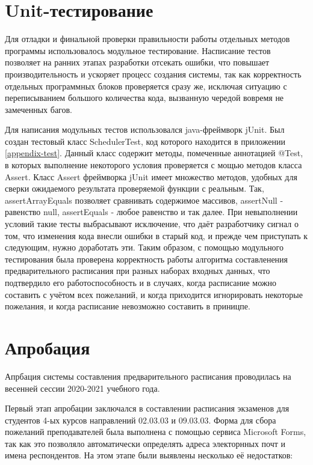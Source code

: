 \section{Unit-тестирование} \label{ch4:sec2}

 Для отладки и финальной проверки правильности работы отдельных методов программы использовалось модульное тестирование. Насписание тестов позволяет на ранних этапах разработки отсекать ошибки, что повышает производительность и ускоряет процесс создания системы, так как корректность отдельных программных блоков проверяется сразу же, исключая ситуацию с переписыванием большого количества кода, вызванную чередой вовремя не замеченных багов.
 
 Для написания модульных тестов использовался java-фреймворк jUnit. Был создан тестовый класс SchedulerTest, код которого находится в приложении \ref{appendix-test}. Данный класс содержит методы, помеченные аннотацией @Test, в которых выполнение некоторого условия проверяется с мощью методов класса Assert. Класс Assert фреймворка jUnit имеет множество методов, удобных для сверки ожидаемого результата проверяемой функции с реальным. Так, assertArrayEquals позволяет сравнивать содержимое массивов, assertNull - равенство null, assertEquals - любое равенство и так далее. При невыполнении условий такие тесты выбрасывают исключение, что даёт разработчику сигнал о том, что изменения кода внесли ошибки в старый код, и прежде чем приступать к следующим, нужно доработать эти. Таким образом, с помощью модульного тестирования была проверена корректность работы алгоритма составленения предварительного расписания при разных наборах входных данных, что подтвердило его работоспособность и в случаях, когда расписание можно составить с учётом всех пожеланий, и когда приходится игнорировать некоторые пожелания, и когда расписание невозможно составить в приницпе. 
 
 \section{Апробация} \label{ch4:sec3}
 Апрбация системы составления предварительного расписания проводилась на весенней сессии 2020-2021 учебного года. 
 
 Первый этап апробации заключался в составлении расписания экзаменов для студентов 4-ых курсов направлений 02.03.03 и 09.03.03. Форма для сбора пожеланий преподавателей была выполнена с помощью сервиса Microsoft Forms, так как это позволяло автоматически определять адреса электорнных почт и имена респондентов. На этом этапе были выявлены несколько её недостатков:

